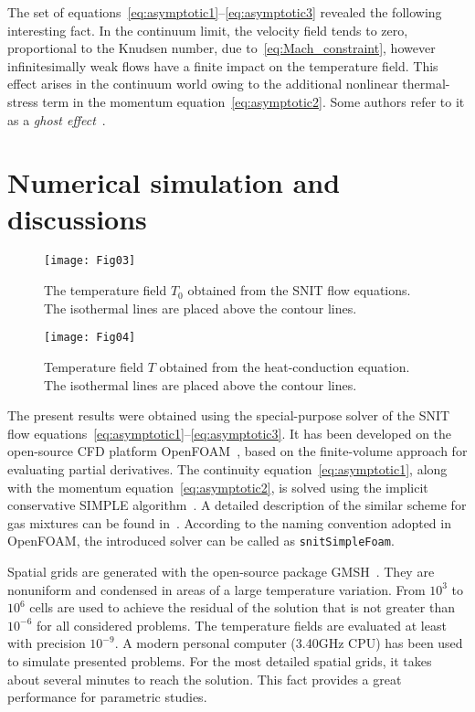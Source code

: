 \documentclass[smallextended, final]{svjour3} %
\begin{document}
The set of equations~\eqref{eq:asymptotic1}--\eqref{eq:asymptotic3} revealed the following interesting fact.
In the continuum limit, the velocity field tends to zero, proportional to the Knudsen number,
due to~\eqref{eq:Mach_constraint}, however infinitesimally weak flows
have a finite impact on the temperature field.
This effect arises in the continuum world owing to the additional nonlinear thermal-stress term
in the momentum equation~\eqref{eq:asymptotic2}.
Some authors refer to it as a \emph{ghost effect}~\cite{Sone2002, Sone2007}.

\section{Numerical simulation and discussions}

\begin{figure}[ht]
    \centering
    \texttt{[image: Fig03]}
    \caption{The temperature field \(T_0\) obtained from the SNIT flow equations.
        The isothermal lines are placed above the contour lines.}
    \label{fig:moving:T_asym}
\end{figure}

\begin{figure}[ht]
    \centering
    \texttt{[image: Fig04]}
    \caption{Temperature field \(T\) obtained from the heat-conduction equation.
        The isothermal lines are placed above the contour lines.}
    \label{fig:moving:T_heat}
\end{figure}

The present results were obtained using the special-purpose solver of
the SNIT flow equations~\eqref{eq:asymptotic1}--\eqref{eq:asymptotic3}.
It has been developed on the open-source CFD platform OpenFOAM\textregistered{}~\cite{OpenFOAM1998},
based on the finite-volume approach for evaluating partial derivatives.
The continuity equation~\eqref{eq:asymptotic1}, along with the momentum equation~\eqref{eq:asymptotic2},
is solved using the implicit conservative SIMPLE algorithm~\cite{SIMPLE}.
A detailed description of the similar scheme for gas mixtures can be found in~\cite{Laneryd2007}.
According to the naming convention adopted in OpenFOAM\textregistered{},
the introduced solver can be called as \verb+snitSimpleFoam+.

Spatial grids are generated with the open-source package GMSH~\cite{GMSH}.
They are nonuniform and condensed in areas of a large temperature variation.
From \(10^3\) to \(10^6\) cells are used to achieve the residual of the solution
that is not greater than \(10^{-6}\) for all considered problems.
The temperature fields are evaluated at least with precision \(10^{-9}\).
A modern personal computer (3.40GHz CPU) has been used to simulate presented problems.
For the most detailed spatial grids, it takes about several minutes to reach the solution.
This fact provides a great performance for parametric studies.
\end{document}
